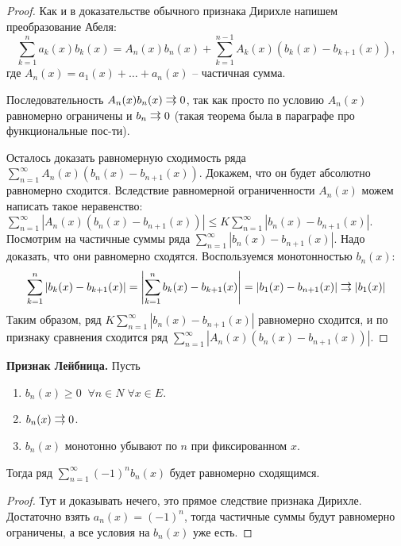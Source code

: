 \begin{proof}
    Как и в доказательстве обычного признака Дирихле напишем преобразование Абеля: \[ \sum_{k=1}^n a_k(x)b_k(x) = A_n(x)b_n(x) + \sum_{k=1}^{n-1} A_k(x)(b_k(x) - b_{k+1}(x)), \]
    где $A_n(x) = a_1(x) + \dots + a_n(x)$ -- частичная сумма.

    \quad Последовательность $A_n(x)b_n(x) \doublerightarrow 0$, так как просто по условию $A_n(x)$ равномерно ограничены и $b_n \doublerightarrow 0$ (такая теорема была в параграфе про функциональные пос-ти).

    \quad Осталось доказать равномерную сходимость ряда $\sum\limits_{n = 1}^\infty A_n(x)(b_n(x) - b_{n+1}(x))$.
    Докажем, что он будет абсолютно равномерно сходится.
    Вследствие равномерной ограниченности $A_n(x)$ можем написать такое неравенство: $\sum\limits_{n = 1}^\infty \left|A_n(x)(b_n(x) - b_{n+1}(x))\right| \leqslant K\sum\limits_{n = 1}^\infty \left|b_n(x) - b_{n+1}(x)\right|$.
    Посмотрим на частичные суммы ряда $\sum\limits_{n = 1}^\infty \left|b_n(x) - b_{n+1}(x)\right|$.
    Надо доказать, что они равномерно сходятся.
    Воспользуемся монотонностью $b_n(x)$: \[ \sum\limits_{k = 1}^n \left|b_k(x) - b_{k+1}(x)\right| = \left|\sum\limits_{k = 1}^n b_k(x) - b_{k+1}(x)\right| = |b_1(x) - b_{n+1}(x)| \doublerightarrow |b_1(x)| \]
    \quad Таким образом, ряд $K\sum\limits_{n = 1}^\infty \left|b_n(x) - b_{n+1}(x)\right|$ равномерно сходится, и по признаку сравнения сходится ряд $\sum\limits_{n = 1}^\infty \left|A_n(x)(b_n(x) - b_{n+1}(x))\right|$.
\end{proof}

\textbf{Признак Лейбница.} Пусть \begin{enumerate}
    \item $b_n(x) \geqslant 0 \;\; \forall n \in N \; \forall x \in E$.
    \item $b_n(x) \doublerightarrow 0$.
    \item $b_n(x)$ монотонно убывают по $n$ при фиксированном $x$.
\end{enumerate}
Тогда ряд $\sum\limits_{n = 1}^\infty (-1)^nb_n(x)$ будет равномерно сходящимся.

\begin{proof}
    Тут и доказывать нечего, это прямое следствие признака Дирихле.
    Достаточно взять $a_n(x) = (-1)^n$, тогда частичные суммы будут равномерно ограничены, а все условия на $b_n(x)$ уже есть.
\end{proof}

